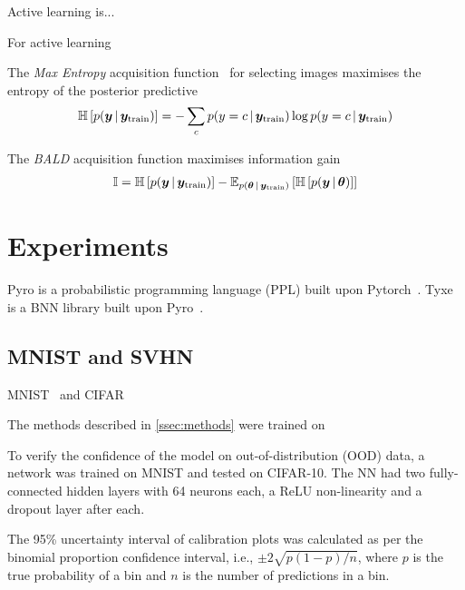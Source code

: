 \documentclass[10pt,a4paper,twocolumn]{article}
\begin{document}
Active learning is...

For active learning 

The \emph{Max Entropy} acquisition function~\cite{gal2017deep,shannon1948mathematical} for selecting images maximises the entropy of the posterior predictive
\begin{align}
    \mathbb{H}\left[p(\bm y \, | \, \bm y_{\text{train}})\right] = -\sum_c p(y = c \, | \, \bm y_{\text{train}}) \log p(y = c \, | \, \bm y_{\text{train}})
\end{align}

The \emph{BALD} acquisition function maximises information gain
\begin{align}
    \mathbb{I} = \mathbb{H}\left[p(\bm y \, | \, \bm y_{\text{train}})\right] - \mathbb{E}_{p(\bm \theta \, | \, \bm y_{\text{train}})}\left[\mathbb{H}\left[p(\bm y \, | \, \bm \theta)\right]\right]
\end{align}

\section{Experiments}

\cite{paszke2019pytorch}
Pyro is a probabilistic programming language (PPL) built upon Pytorch~\cite{bingham2018pyro}.
Tyxe is a BNN library built upon Pyro~\cite{ritter2021tyxe}.

\subsection{MNIST and SVHN}\label{ssec:exp-mnist}

MNIST~\cite{lecun1998gradient} and CIFAR~\cite{krizhevsky2009learning} 

The methods described in \cref{ssec:methods} were trained on 

To verify the confidence of the model on out-of-distribution (OOD) data, a network was trained on MNIST and tested on CIFAR-10.
The NN had two fully-connected hidden layers with 64 neurons each, a ReLU non-linearity and a dropout layer after each.

The 95\% uncertainty interval of calibration plots was calculated as per the binomial proportion confidence interval, i.e., \(\pm 2 \sqrt{p (1-p) / n}\), where \(p\) is the true probability of a bin and \(n\) is the number of predictions in a bin.
\end{document}
